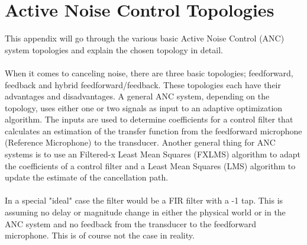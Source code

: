 \section{Active Noise Control Topologies} \label{sec:BasicSystem}
This appendix will go through the various basic Active Noise Control (ANC) system topologies and explain the chosen topology in detail. \\\\
When it comes to canceling noise, there are three basic topologies; feedforward, feedback and hybrid feedforward/feedback. These topologies each have their advantages and disadvantages.
A general ANC system, depending on the topology, uses either one or two signals as input to an adaptive optimization algorithm. The inputs are used to determine coefficients for a control filter that calculates an estimation of the transfer function from the feedforward microphone (Reference Microphone) to the transducer. Another general thing for ANC systems is to use an Filtered-x Least Mean Squares (FXLMS) algorithm to adapt the coefficients of a control filter and a Least Mean Squares (LMS) algorithm to update the estimate of the cancellation path.
\\\\
In a special "ideal" case the filter would be a FIR filter with a -1 tap. This is assuming no delay or magnitude change in either the physical world or in the ANC system and no feedback from the transducer to the feedforward microphone. This is of course not the case in reality. 


